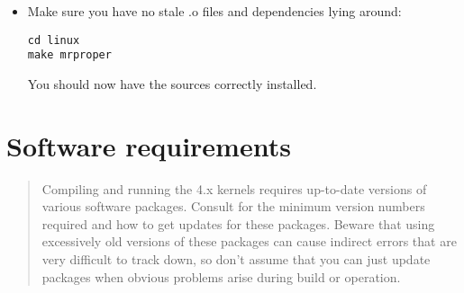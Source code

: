 \documentclass[a4paper,8pt,english]{sphinxmanual}
\def\PYGZhy{\char`\-}
\begin{document}
\begin{itemize}
Alternatively, the script patch-kernel can be used to automate this
process.  It determines the current kernel version and applies any
patches found:

\begin{Verbatim}[commandchars=\\\{\}]
linux/scripts/patch\PYGZhy{}kernel linux
\end{Verbatim}

The first argument in the command above is the location of the
kernel source.  Patches are applied from the current directory, but
an alternative directory can be specified as the second argument.

\item {} 
Make sure you have no stale .o files and dependencies lying around:

\begin{Verbatim}[commandchars=\\\{\}]
cd linux
make mrproper
\end{Verbatim}

You should now have the sources correctly installed.

\end{itemize}


\section{Software requirements}
\label{admin-guide/README:software-requirements}\begin{quote}

Compiling and running the 4.x kernels requires up-to-date
versions of various software packages.  Consult
 for the minimum version numbers
required and how to get updates for these packages.  Beware that using
excessively old versions of these packages can cause indirect
errors that are very difficult to track down, so don't assume that
you can just update packages when obvious problems arise during
build or operation.
\end{quote}
\end{document}
